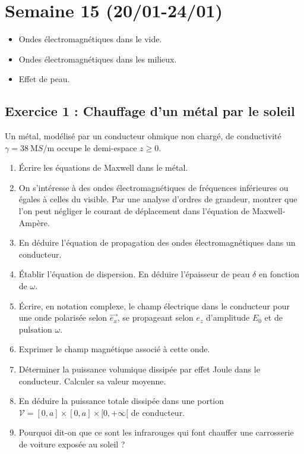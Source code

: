 \section{Semaine 15 (20/01-24/01) }

\begin{itemize}
	\item Ondes électromagnétiques dans le vide.
	\item Ondes électromagnétiques dans les milieux.
	\item Effet de peau.
\end{itemize}

\subsection{Exercice 1 : Chauffage d'un métal par le soleil}

Un métal, modélisé par un conducteur ohmique non chargé, de conductivité $\gamma = \SI{38}{\mega S\per\meter}$ occupe le demi-espace $z \geq 0$. 

\begin{enumerate}
	\item Écrire les équations de Maxwell dans le métal.
	\item On s'intéresse à des ondes électromagnétiques de fréquences inférieures ou égales à celles du visible. Par une analyse d'ordres de grandeur, montrer que l'on peut négliger le courant de déplacement dans l'équation de Maxwell-Ampère.
	\item En déduire l'équation de propagation des ondes électromagnétiques dans un conducteur.
	\item Établir l'équation de dispersion. En déduire l'épaisseur de peau $\delta$ en fonction de $\omega$.
	\item Écrire, en notation complexe, le champ électrique dans le conducteur pour une onde polarisée selon $\vec{e_x}$, se propageant selon $e_z$ d'amplitude $E_0$ et de pulsation $\omega$.
	\item Exprimer le champ magnétique associé à cette onde.
	\item Déterminer la puissance volumique dissipée par effet Joule dans le conducteur. Calculer sa valeur moyenne. 
	\item En déduire la puissance totale dissipée dans une portion $\mathcal{V} = [0, a]\times[0, a]\times[0, +\infty[$ de conducteur. 
	\item Pourquoi dit-on que ce sont les infrarouges qui font chauffer une carrosserie de voiture exposée au soleil ?
\end{enumerate}

